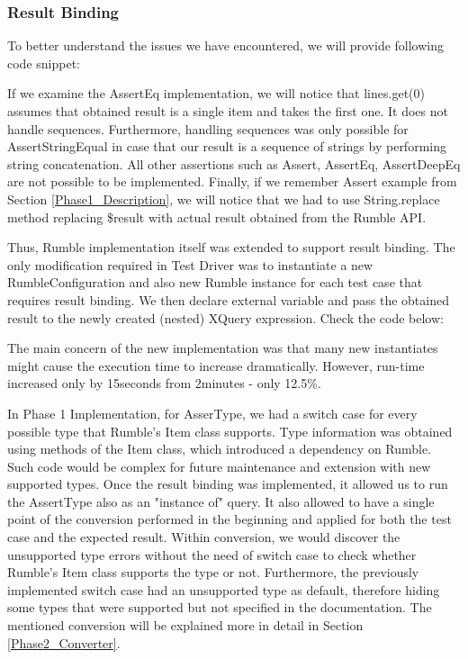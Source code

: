 \subsubsection{Result Binding}
To better understand the issues we have encountered, we will provide following code snippet:



If we examine the AssertEq implementation, we will notice that lines.get(0) assumes that obtained result is a single item and takes the first one. It does not handle sequences. Furthermore, handling sequences was only possible for AssertStringEqual in case that our result is a sequence of strings by performing string concatenation. All other assertions such as Assert, AssertEq, AssertDeepEq are not possible to be implemented. Finally, if we remember Assert example from Section \ref{Phase1_Description}, we will notice that we had to use String.replace method replacing \$result with actual result obtained from the Rumble API. 

Thus, Rumble implementation itself was extended to support result binding. The only modification required in Test Driver was to instantiate a new RumbleConfiguration and also new Rumble instance for each test case that requires result binding. We then declare external variable and pass the obtained result to the newly created (nested) XQuery expression. Check the code below:



The main concern of the new implementation was that many new instantiates might cause the execution time to increase dramatically. However, run-time increased only by 15seconds from 2minutes - only 12.5\%.

In Phase 1 Implementation, for AsserType, we had a switch case for every possible type that Rumble's Item class supports. Type information was obtained using methods of the Item class, which introduced a dependency on Rumble. Such code would be complex for future maintenance and extension with new supported types. Once the result binding was implemented, it allowed us to run the AssertType also as an "instance of" query. It also allowed to have a single point of the conversion performed in the beginning and applied for both the test case and the expected result. Within conversion, we would discover the unsupported type errors without the need of switch case to check whether Rumble's Item class supports the type or not. Furthermore, the previously implemented switch case had an unsupported type as default, therefore hiding some types that were supported but not specified in the documentation. The mentioned conversion will be explained more in detail in Section \ref{Phase2_Converter}. 

